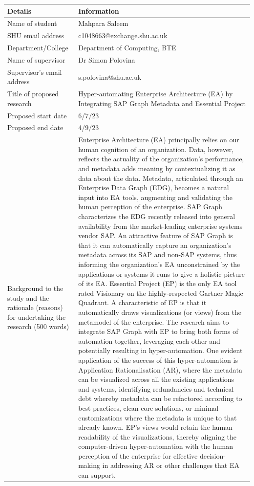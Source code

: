 \documentclass{article}
\begin{document}
\begin{longtable}{|p{4.5cm}|p{6.5cm}|}
\hline
Details & Information \\
\hline
Name of student & Mahpara Saleem \\
SHU email address & c1048663@exchange.shu.ac.uk \\
Department/College & Department of Computing, BTE \\
Name of supervisor & Dr Simon Polovina \\
Supervisor’s email address & s.polovina@shu.ac.uk \\
Title of proposed research & Hyper-automating Enterprise Architecture (EA) by Integrating SAP Graph Metadata and Essential Project \\
Proposed start date & 6/7/23 \\
Proposed end date & 4/9/23 \\
Background to the study and the rationale (reasons) for undertaking the research (500 words) & Enterprise Architecture (EA) principally relies on our human cognition of an organization. Data, however, reflects the actuality of the organization’s performance, and metadata adds meaning by contextualizing it as data about the data. Metadata, articulated through an Enterprise Data Graph (EDG), becomes a natural input into EA tools, augmenting and validating the human perception of the enterprise. SAP Graph characterizes the EDG recently released into general availability from the market-leading enterprise systems vendor SAP. An attractive feature of SAP Graph is that it can automatically capture an organization’s metadata across its SAP and non-SAP systems, thus informing the organization’s EA unconstrained by the applications or systems it runs to give a holistic picture of its EA. Essential Project (EP) is the only EA tool rated Visionary on the highly-respected Gartner Magic Quadrant. A characteristic of EP is that it automatically draws visualizations (or views) from the metamodel of the enterprise. The research aims to integrate SAP Graph with EP to bring both forms of automation together, leveraging each other and potentially resulting in hyper-automation. One evident application of the success of this hyper-automation is Application Rationalisation (AR), where the metadata can be visualized across all the existing applications and systems, identifying redundancies and technical debt whereby metadata can be refactored according to best practices, clean core solutions, or minimal customizations where the metadata is unique to that already known. EP’s views would retain the human readability of the visualizations, thereby aligning the computer-driven hyper-automation with the human perception of the enterprise for effective decision-making in addressing AR or other challenges that EA can support. \\

\end{longtable}
\end{document}
